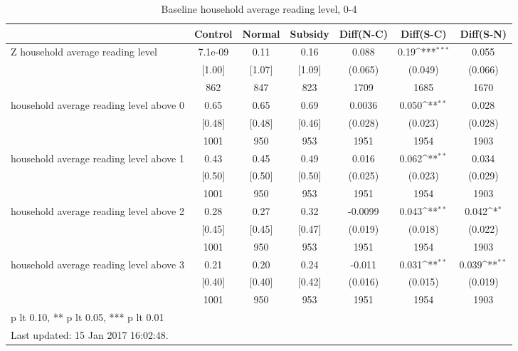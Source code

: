 \begin{table}[htbp]\centering
\def\sym#1{\ifmmode^{#1}\else\(^{#1}\)\fi}
\caption{Baseline household average reading level, 0-4 \label{tab:"balance"}}
\begin{tabular*}{1\hsize}{@{\hskip\tabcolsep\extracolsep\fill}l*{1}{cccccc}}
\toprule
                                &  Control&   Normal&  Subsidy&Diff(N-C)         &Diff(S-C)         &Diff(S-N)         \\
\midrule
Z household average reading level&  7.1e-09&     0.11&     0.16&    0.088         &     0.19\sym{***}&    0.055         \\
                                &   [1.00]&   [1.07]&   [1.09]&  (0.065)         &  (0.049)         &  (0.066)         \\
                                &      862&      847&      823&     1709         &     1685         &     1670         \\
household average reading level above 0&     0.65&     0.65&     0.69&   0.0036         &    0.050\sym{**} &    0.028         \\
                                &   [0.48]&   [0.48]&   [0.46]&  (0.028)         &  (0.023)         &  (0.028)         \\
                                &     1001&      950&      953&     1951         &     1954         &     1903         \\
household average reading level above 1&     0.43&     0.45&     0.49&    0.016         &    0.062\sym{**} &    0.034         \\
                                &   [0.50]&   [0.50]&   [0.50]&  (0.025)         &  (0.023)         &  (0.029)         \\
                                &     1001&      950&      953&     1951         &     1954         &     1903         \\
household average reading level above 2&     0.28&     0.27&     0.32&  -0.0099         &    0.043\sym{**} &    0.042\sym{*}  \\
                                &   [0.45]&   [0.45]&   [0.47]&  (0.019)         &  (0.018)         &  (0.022)         \\
                                &     1001&      950&      953&     1951         &     1954         &     1903         \\
household average reading level above 3&     0.21&     0.20&     0.24&   -0.011         &    0.031\sym{**} &    0.039\sym{**} \\
                                &   [0.40]&   [0.40]&   [0.42]&  (0.016)         &  (0.015)         &  (0.019)         \\
                                &     1001&      950&      953&     1951         &     1954         &     1903         \\
\bottomrule
\multicolumn{7}{l}{\footnotesize * p lt 0.10, ** p lt 0.05, *** p lt 0.01}\\
\multicolumn{7}{l}{\footnotesize Last updated: 15 Jan 2017 16:02:48.}\\
\end{tabular*}
\end{table}
